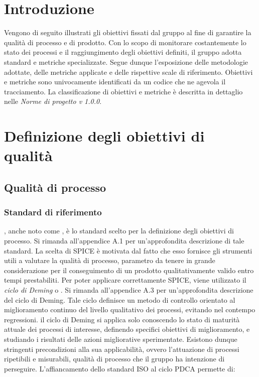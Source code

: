 \documentclass[openany,12pt,a4paper]{report}
\begin{document}
    \section{Introduzione}
    
    Vengono di seguito illustrati gli obiettivi fissati dal gruppo al fine di garantire la qualità di processo e di prodotto. Con lo scopo di monitorare costantemente lo stato dei processi e il raggiungimento degli obiettivi definiti, il gruppo adotta standard e metriche specializzate. Segue dunque l'esposizione delle metodologie adottate, delle metriche applicate e delle rispettive scale di riferimento.
    Obiettivi e metriche sono univocamente identificati da un codice che ne agevola il tracciamento. La classificazione di obiettivi e metriche è descritta in dettaglio nelle \textit{Norme di progetto v 1.0.0}.
    
    \section{Definizione degli obiettivi di qualità}    
    
    \subsection{Qualità di processo}
    
    \subsubsection{Standard di riferimento}
    
    , anche noto come , è lo standard scelto per la definizione degli obiettivi di processo. Si rimanda all'appendice A.1 per un'approfondita descrizione di tale standard.
    La scelta di SPICE è motivata dal fatto che esso fornisce gli strumenti utili a valutare la qualità di processo, parametro da tenere in grande considerazione per il conseguimento di un prodotto qualitativamente valido entro tempi prestabiliti. 
    Per poter applicare correttamente SPICE, viene utilizzato il \textit{ciclo di Deming} o . Si rimanda all'appendice A.3 per un'approfondita descrizione del ciclo di Deming. Tale ciclo definisce un metodo di controllo orientato al miglioramento continuo del livello qualitativo dei processi, evitando nel contempo regressioni. il ciclo di Deming si applica solo conoscendo lo stato di maturità attuale dei processi di interesse, definendo specifici obiettivi di miglioramento, e studiando i risultati delle azioni migliorative sperimentate. Esistono dunque  stringenti precondizioni alla sua applicabilità, ovvero l'attuazione di processi ripetibili e misurabili, qualità di processo che il gruppo ha intenzione di perseguire. L'affiancamento dello standard ISO al ciclo PDCA permette di:
    
\end{document}
